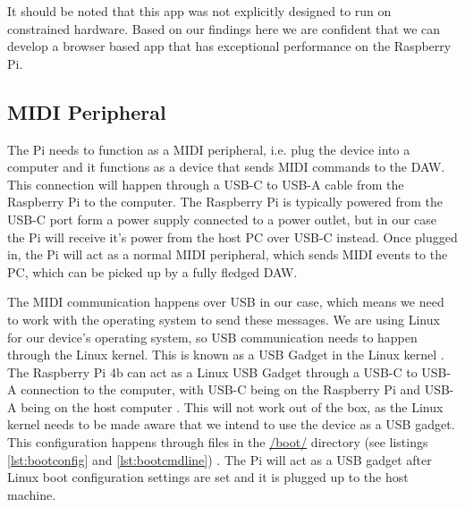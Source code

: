 It should be noted that this app was not explicitly designed to run on constrained
hardware. Based on our findings here we are confident that we can develop a browser based
app that has exceptional performance on the Raspberry Pi.

\subsection{MIDI Peripheral}

The Pi needs to function as a MIDI peripheral, i.e. plug the device into a computer and it
functions as a device that sends MIDI commands to the DAW. This connection will happen
through a USB-C to USB-A cable from the Raspberry Pi to the computer. The Raspberry Pi is
typically powered from the USB-C port form a power supply connected to a power outlet, but
in our case the Pi will receive it's power from the host PC over USB-C instead. Once
plugged in, the Pi will act as a normal MIDI peripheral, which sends MIDI events to the
PC, which can be picked up by a fully fledged DAW.

The MIDI communication happens over USB in our case, which means we need to work with the
operating system to send these messages. We are using Linux for our device's operating
system, so USB communication needs to happen through the Linux kernel. This is known as a
USB Gadget in the Linux kernel \autocite{usbGadgetDocumentation}. The Raspberry Pi 4b can
act as a Linux USB Gadget through a USB-C to USB-A connection to the computer, with USB-C
being on the Raspberry Pi and USB-A being on the host computer
\autocite{raspberryPiGadgetSetup}. This will not work out of the box, as the Linux kernel
needs to be made aware that we intend to use the device as a USB gadget. This
configuration happens through files in the \url{/boot/} directory
(see listings \ref{lst:bootconfig} and
\ref{lst:bootcmdline}) \autocite{raspberryPiGadgetSetup}. The Pi will act as a USB
gadget after Linux boot configuration settings are set and it is plugged up to the host
machine.

